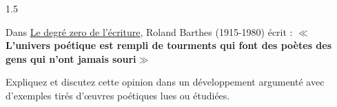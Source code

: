 \documentclass[12pt]{article}
\begin{document}
\begin{spacing}{1.5}

Dans \underline{Le degré zero de l'écriture}, Roland Barthes (1915-1980) écrit : $\ll$ \textbf{L'univers poétique est rempli de tourments qui font des poètes des gens qui n'ont jamais souri}$\gg$

Expliquez et discutez cette opinion dans un développement argumenté avec d'exemples tirés d'œuvres poétiques lues ou étudiées.

\quad

\end{spacing}
\end{document}
